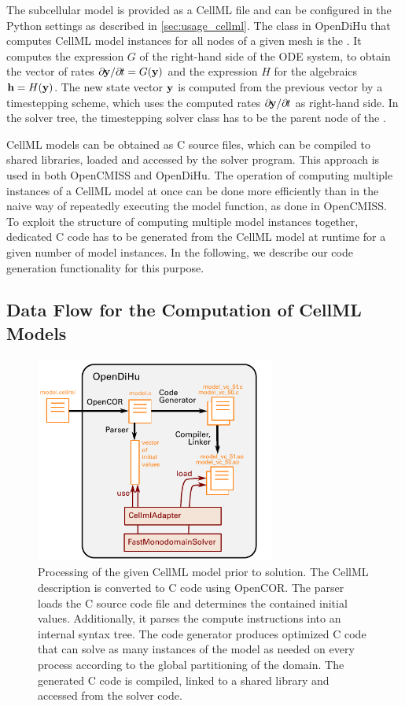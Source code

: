 The subcellular model is provided as a CellML file and can be configured in the Python settings as described in \cref{sec:usage_cellml}.
The class in OpenDiHu that computes CellML model instances for all nodes of a given mesh is the . It computes the expression $G$ of the right-hand side of the ODE system, to obtain the vector of rates $\partial \bfy / \partial t = G(\bfy)$ and the expression $H$ for the algebraics $\textbf{h}=H(\textbf{y})$. The new state vector $\textbf{y}$ is computed from the previous vector by a timestepping scheme, which uses the computed rates $\partial \bfy / \partial t$ as right-hand side. In the solver tree, the timestepping solver class has to be the parent node of the .

CellML models can be obtained as C source files, which can be compiled to shared libraries, loaded and accessed by the solver program. This approach is used in both OpenCMISS and OpenDiHu.
The operation of computing multiple instances of a CellML model at once can be done more efficiently than in the naive way of repeatedly executing the model function, as done in OpenCMISS. To exploit the structure of computing multiple model instances together, dedicated C code has to be generated from the CellML model at runtime for a given number of model instances.
In the following, we describe our code generation functionality for this purpose.

\subsection{Data Flow for the Computation of CellML Models}

\begin{figure}%
  \centering%
  \includegraphics[width=0.7\textwidth]{images/implementation/cellml_scheme.pdf}%
  \caption{Processing of the given CellML model prior to solution. The CellML description is converted to C code using OpenCOR. The parser loads the C source code file and determines the contained initial values. Additionally, it parses the compute instructions into an internal syntax tree. The code generator produces optimized C code that can solve as many instances of the model as needed on every process according to the global partitioning of the domain. The generated C code is compiled, linked to a shared library and accessed from the solver code.}
  \label{fig:cellml_scheme}%
\end{figure}%

